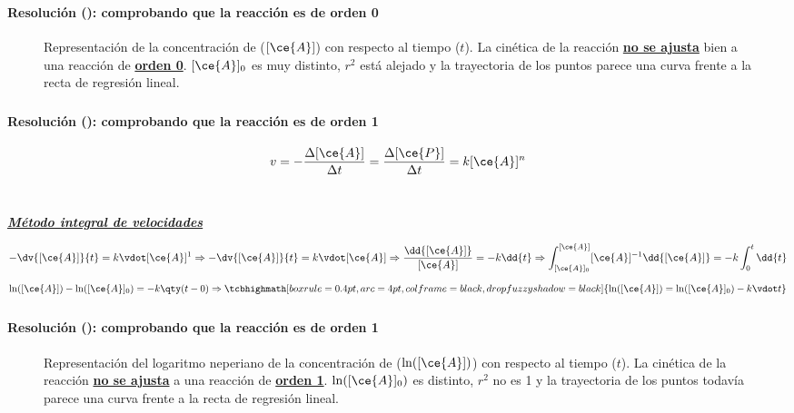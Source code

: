 \begin{frame}
	\frametitle{\ejerciciocmd}
	\framesubtitle{Resolución (): comprobando que la reacción es de orden 0}
    \begin{center}
        \begin{figure}
            \caption{Representación de la concentración de  ($[\ce{A}]$) con respecto al tiempo ($t$). La cinética de la reacción \textbf{\underline{no se ajusta}} bien a una reacción de \textbf{\underline{orden 0}}. $[\ce{A}]_0$ es muy distinto, $r^2$ está alejado y la trayectoria de los puntos parece una curva frente a la recta de regresión lineal.}
            
        \end{figure}
    \end{center}
\end{frame}

\begin{frame}
	\frametitle{\ejerciciocmd}
	\framesubtitle{Resolución (): comprobando que la reacción es de orden 1}
	\quad{}
	$$
		v=-\frac{\Delta[\ce{A}]}{\Delta t}=\frac{\Delta[\ce{P}]}{\Delta t}=k[\ce{A}]^n
	$$\\[.4cm]
	\begin{center}
		{\LARGE\textbf{\textit{\underline{Método integral de velocidades}}}}
	\end{center}
	$$
		-\dv{[\ce{A}]}{t}=k\vdot[\ce{A}]^1\Rightarrow
		-\dv{[\ce{A}]}{t}=k\vdot[\ce{A}]\Rightarrow\frac{\dd{[\ce{A}]}}{[\ce{A}]}=-k\dd{t}\Rightarrow\int_{[\ce{A}]_0}^{[\ce{A}]}[\ce{A}]^{-1}\dd{[\ce{A}]}=-k\int_{0}^{t}\dd{t}
	$$
	$$
		\ln([\ce{A}])-\ln([\ce{A}]_0)=-k\qty(t - 0)\Rightarrow
		\tcbhighmath[boxrule=0.4pt,arc=4pt,colframe=black,drop fuzzy shadow=black]{\ln([\ce{A}])=\ln([\ce{A}]_0) - k\vdot t}
	$$
\end{frame}

\begin{frame}
	\frametitle{\ejerciciocmd}
	\framesubtitle{Resolución (): comprobando que la reacción es de orden 1}
	\begin{center}
		\begin{figure}
			\caption{Representación del logaritmo neperiano de la concentración de \ce{A} ($\ln([])$) con respecto al tiempo ($t$). La cinética de la reacción \textbf{\underline{no se ajusta}} a una reacción de \textbf{\underline{orden 1}}. $\ln([\ce{A}]_0)$ es distinto, $r^2$ no es 1 y la trayectoria de los puntos todavía parece una curva frente a la recta de regresión lineal.}
			
		\end{figure}
	\end{center}
\end{frame}

